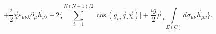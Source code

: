 \begin{equation}
\label{WwW}
+\frac{i}{2}\vec\chi\varepsilon_{\mu\nu\lambda}\partial_\mu\vec h_{\nu\lambda}+
2\zeta
\sum\limits_{i=1}^{N(N-1)/2}
\cos\left(g_m\vec q_i\vec\chi\right)\Biggr]+
\frac{ig}{2}\vec\mu_\alpha\int\limits_{\Sigma(C)}^{}d\sigma_{\mu\nu}\vec h_{\mu\nu}\Biggr\}.
\end{equation}

